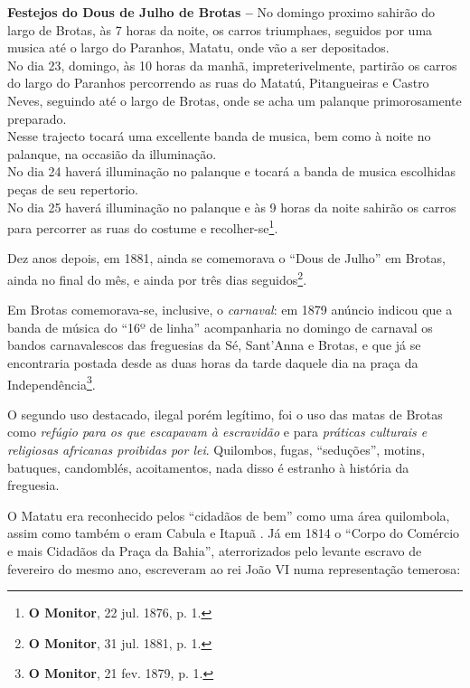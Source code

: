 \begin{citacao}
\textbf{Festejos do Dous de Julho de Brotas --} No domingo proximo sahirão do largo de Brotas, às 7 horas da noite, os carros triumphaes, seguidos por uma musica até o largo do Paranhos, Matatu, onde vão a ser depositados. \\
No dia 23, domingo, às 10 horas da manhã, impreterivelmente, partirão os carros do largo do Paranhos percorrendo as ruas do Matatú, Pitangueiras e Castro Neves, seguindo até o largo de Brotas, onde se acha um palanque primorosamente preparado. \\
Nesse trajecto tocará uma excellente banda de musica, bem como à noite no palanque, na occasião da illuminação. \\
No dia 24 haverá illuminação no palanque e tocará a banda de musica escolhidas peças de seu repertorio. \\
No dia 25 haverá illuminação no palanque e às 9 horas da noite sahirão os carros para percorrer as ruas do costume e recolher-se\footnote{\textbf{O Monitor}, 22 jul. 1876, p. 1.}.
\end{citacao}

Dez anos depois, em 1881, ainda se comemorava o ``Dous de Julho'' em Brotas, ainda no final do mês, e ainda por três dias seguidos\footnote{\textbf{O Monitor}, 31 jul. 1881, p. 1.}.

Em Brotas comemorava-se, inclusive, o \textit{carnaval}: em 1879 anúncio indicou que a banda de música do ``16º de linha'' acompanharia no domingo de carnaval os bandos carnavalescos das freguesias da Sé, Sant'Anna e Brotas, e que já se encontraria postada desde as duas horas da tarde daquele dia na praça da Independência\footnote{\textbf{O Monitor}, 21 fev. 1879, p. 1.}.

O segundo uso destacado, ilegal porém legítimo, foi o uso das matas de Brotas como \textit{refúgio para os que escapavam à escravidão} e para \textit{práticas culturais e religiosas africanas proibidas por lei}. Quilombos, fugas, ``seduções'', motins, batuques, candomblés, acoitamentos, nada disso é estranho à história da freguesia.

O Matatu era reconhecido pelos ``cidadãos de bem'' como uma área quilombola, assim como também o eram Cabula e Itapuã \cite[p.~377]{schwartz_1814_1996}. Já em 1814 o ``Corpo do Comércio e mais Cidadãos da Praça da Bahia'', aterrorizados pelo levante escravo de fevereiro do mesmo ano, escreveram ao rei João VI numa representação temerosa:


